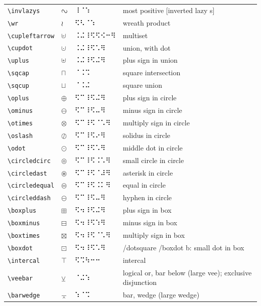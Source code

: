 \documentclass[oneside]{article}
\begin{document}
\begin{longtable}{llll}
\verb|\invlazys| & $\invlazys$ &  ⠸⠈⠱  & {most positive [inverted lazy s]} \\[2ex]
\verb|\wr| & $\wr$ &  ⠫⠣⠈⠱  & {wreath product} \\[2ex]
\verb|\cupleftarrow| & $\cupleftarrow$ &  ⠨⠬⠸⠫⠫⠪⠒⠻  & {multiset} \\[2ex]
\verb|\cupdot| & $\cupdot$ &  ⠨⠬⠸⠫⠡⠻  & {union, with dot} \\[2ex]
\verb|\uplus| & $\uplus$ &  ⠨⠬⠸⠫⠬⠻  & {plus sign in union} \\[2ex]
\verb|\sqcap| & $\sqcap$ &  ⠈⠨⠩  & {square intersection} \\[2ex]
\verb|\sqcup| & $\sqcup$ &  ⠈⠨⠬  & {square union} \\[2ex]
\verb|\oplus| & $\oplus$ &  ⠫⠉⠸⠫⠬⠻  & {plus sign in circle} \\[2ex]
\verb|\ominus| & $\ominus$ &  ⠫⠉⠸⠫⠤⠻  & {minus sign in circle} \\[2ex]
\verb|\otimes| & $\otimes$ &  ⠫⠉⠸⠫⠈⠡⠻  & {multiply sign in circle} \\[2ex]
\verb|\oslash| & $\oslash$ &  ⠫⠉⠸⠫⠔⠻  & {solidus in circle} \\[2ex]
\verb|\odot| & $\odot$ &  ⠫⠉⠸⠫⠡⠻  & {middle dot in circle} \\[2ex]
\verb|\circledcirc| & $\circledcirc$ &  ⠫⠉⠸⠫⠨⠡⠻  & {small circle in circle} \\[2ex]
\verb|\circledast| & $\circledast$ &  ⠫⠉⠸⠫⠈⠼⠻  & {asterisk in circle} \\[2ex]
\verb|\circledequal| & $\circledequal$ &  ⠫⠉⠸⠫⠨⠅⠻  & {equal in circle} \\[2ex]
\verb|\circleddash| & $\circleddash$ &  ⠫⠉⠸⠫⠤⠻  & {hyphen in circle} \\[2ex]
\verb|\boxplus| & $\boxplus$ &  ⠫⠲⠸⠫⠬⠻  & {plus sign in box} \\[2ex]
\verb|\boxminus| & $\boxminus$ &  ⠫⠲⠸⠫⠱⠻  & {minus sign in box} \\[2ex]
\verb|\boxtimes| & $\boxtimes$ &  ⠫⠲⠸⠫⠈⠡⠻  & {multiply sign in box} \\[2ex]
\verb|\boxdot| & $\boxdot$ &  ⠫⠲⠸⠫⠡⠻  & {/dotsquare /boxdot b: small dot in box} \\[2ex]
\verb|\intercal| & $\intercal$ &  ⠫⠩⠳⠒⠒  & {intercal} \\[2ex]
\verb|\veebar| & $\veebar$ &  ⠈⠬⠱  & {logical or, bar below (large vee); exclusive disjunction} \\[2ex]
\verb|\barwedge| & $\barwedge$ &  ⠱⠈⠩  & {bar, wedge (large wedge)} \\[2ex]

\end{longtable}
\end{document}
